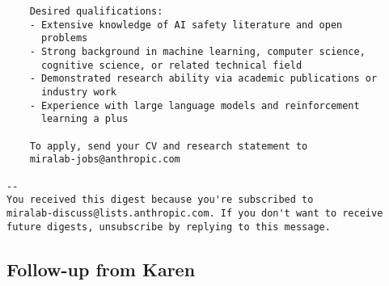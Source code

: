 \documentclass{article}
\begin{document}
\begin{verbatim}
    Desired qualifications:  
    - Extensive knowledge of AI safety literature and open 
      problems
    - Strong background in machine learning, computer science, 
      cognitive science, or related technical field
    - Demonstrated research ability via academic publications or 
      industry work  
    - Experience with large language models and reinforcement 
      learning a plus

    To apply, send your CV and research statement to  
    miralab-jobs@anthropic.com

--
You received this digest because you're subscribed to 
miralab-discuss@lists.anthropic.com. If you don't want to receive 
future digests, unsubscribe by replying to this message.
\end{verbatim}

\subsection{Follow-up from Karen}
\label{apx:karenemail}
\end{document}
